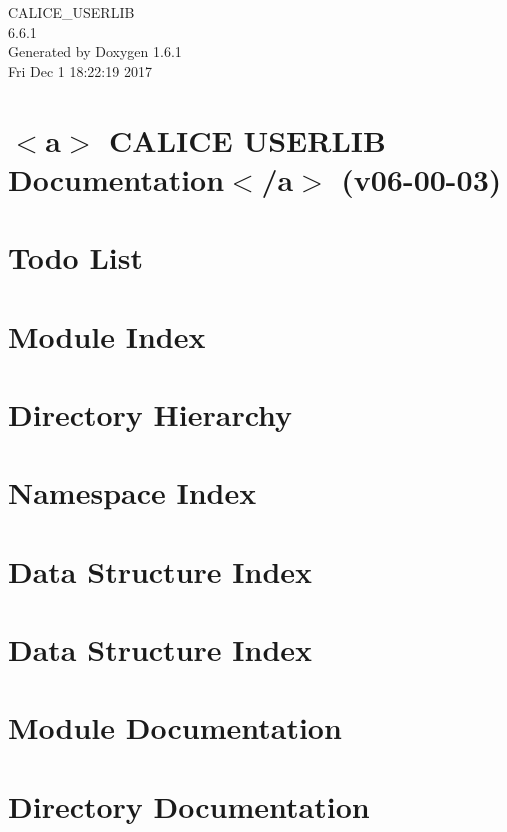 \documentclass[a4paper]{book}
\begin{document}
\begin{titlepage}
\vspace*{7cm}
\begin{center}
{\Large CALICE\_\-USERLIB \\[1ex]\large 6.6.1 }\\
\vspace*{1cm}
{\large Generated by Doxygen 1.6.1}\\
\vspace*{0.5cm}
{\small Fri Dec 1 18:22:19 2017}\\
\end{center}
\end{titlepage}
\clearemptydoublepage
{}
\tableofcontents
\clearemptydoublepage
{}
\chapter{$<$a$>$ CALICE USERLIB Documentation$<$/a$>$ (v06-\/00-\/03)}
\label{index}
\chapter{Todo List}
\label{todo}

\chapter{Module Index}

\chapter{Directory Hierarchy}

\chapter{Namespace Index}

\chapter{Data Structure Index}

\chapter{Data Structure Index}

\chapter{Module Documentation}





\chapter{Directory Documentation}






\end{document}
